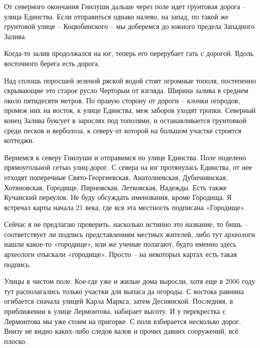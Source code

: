 

От северного окончания Гнилуши дальше через поле идет грунтовая дорога – улица Единства. Если отправиться однако налево, на запад, по такой же грунтовой улице – Коцюбинского – мы доберемся до южного предела Западного Залива.

Когда-то залив продолжался на юг, теперь его перерубает гать с дорогой. Вдоль восточного берега есть дорога. 

Над сплошь поросшей зеленой ряской водой стоят огромные тополя, постепенно скрывающие это старое русло Черторыи от взгляда. Ширина залива в среднем около пятидесяти метров. По правую сторону от дороги – клочки огородов, промеж них на восток, к улице Единства, меж заборов уходят тропки. Северный конец Залива буксует в зарослях под тополями, и останавливается грунтовкой среди песков и верболоза, к северу от которой на большом участке строятся коттеджи.

Вернемся к северу Гнилуши и отправимся по улице Единства. Поле поделено прямоугольной сетью улиц-дорог. С севера на юг протянулась Единства, от нее отходят поперечные Свято-Георгиевская, Анатолиевская, Дубичнянская, Хотяновская, Городище, Пирновская, Летковская, Надежды. Есть также Кучанский переулок. Не буду обсуждать именования, кроме Городища. Я встречал карты начала 21 века, где вся эта местность подписана «Городище».

Сейчас я не предлагаю проверить, насколько истинно это название, то бишь – соответствует ли подпись представлениям местных жителей, либо тут археологи нашли какое-то «городище», или же ученые полагают, будто именно здесь археологи отыскали «городище». Просто – на некоторых картах есть такая подпись.

Улицы в чистом поле. Кое-где уже и жилые дома выросли, хотя еще в 2006 году тут располагались только участки для выпаса да огороды. С востока равнина огибается сначала улицей Карла Маркса, затем Деснянской. Последняя, в приближении к улице Лермонтова, набирает высоту. И у перекрестка с Лермонтова мы уже стоим на пригорке. С поля взбирается несколько дорог. Внизу не видно каких-либо следов валов и прочих давних сооружений, всё плоско. 


